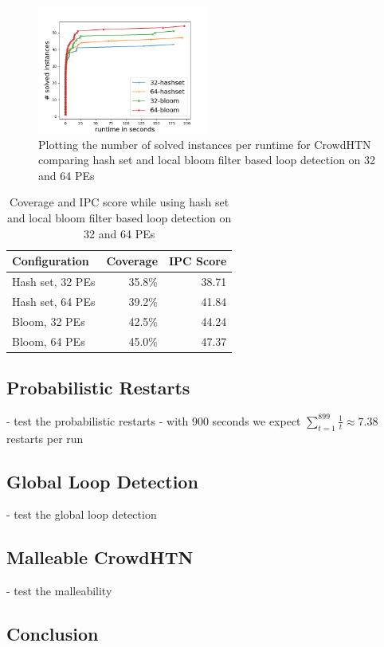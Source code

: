 \begin{figure}
	\caption{Plotting the number of solved instances per runtime for CrowdHTN comparing hash set and local bloom filter based loop detection on 32 and 64 PEs}
	\label{figure: eval loop detection}
	\centering
	\includegraphics[width=0.5\textwidth]{images/final/loop_detection}
\end{figure}
\begin{table}
	\caption{Coverage and IPC score while using hash set and local bloom filter based loop detection on 32 and 64 PEs}
	\label{table: eval loop detection}
	\centering
	\begin{tabular}{| l | r | r |}
		\hline
		Configuration & Coverage & IPC Score \\
		\hline
		Hash set, 32 PEs	& 35.8\%	& 38.71 \\ %
		Hash set, 64 PEs	& 39.2\%	& 41.84 \\ %
		Bloom, 32 PEs		& 42.5\%	& 44.24 \\ %
		Bloom, 64 PEs		& 45.0\%	& 47.37 \\ %
		\hline
	\end{tabular}
\end{table}

\subsection{Probabilistic Restarts}
- test the probabilistic restarts
- with 900 seconds we expect $\sum_{t=1}^{899} \frac{1}{t} \approx 7.38$ restarts per run


\subsection{Global Loop Detection}
- test the global loop detection

\subsection{Malleable CrowdHTN}
- test the malleability

\subsection{Conclusion}
